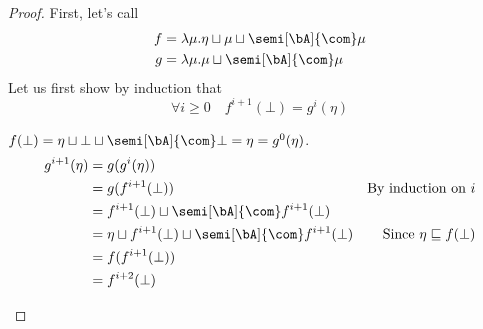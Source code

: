 \begin{proof}
  First, let's call
  \begin{align*}
    f & = \lambda \mu . \eta \sqcup \mu \sqcup \semi[\bA]{\com}\mu \\
    g & = \lambda \mu . \mu \sqcup \semi[\bA]{\com}\mu
  \end{align*}
  Let us first show by induction that 
  \begin{equation}\label{prop2}
    \forall i\geq 0 \quad f^{i+1} (\bot) = g^{i} (\eta) 
  \end{equation}

  \noindent
  \begin{inductive}
     \(f(\bot) = \eta \sqcup \bot \sqcup \semi[\bA]{\com}\bot = \eta = g^0 (\eta)\).
    \begin{align*}
      g^{i+1}(\eta) & = g (g^i (\eta)) \\
                    & = g(f^{i+1}(\bot)) & \text{By induction on } i \\
                    & = f^{i+1}(\bot) \sqcup \semi[\bA]{\com}f^{i+1}(\bot) \\
                    & = \eta \sqcup f^{i+1}(\bot) \sqcup \semi[\bA]{\com}f^{i+1}(\bot) & \text{Since } \eta \sqsubseteq f(\bot)\\
                    & = f ( f^{i+1}(\bot)) \\
                    & = f^{i+2}(\bot)
    \end{align*}
  \end{inductive}
  

\end{proof}

